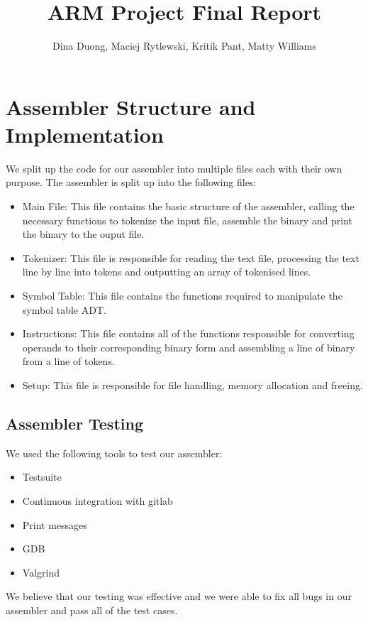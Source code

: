 \documentclass[11pt]{article}
\begin{document}
\title{
    \vspace{-2cm}
    ARM Project Final Report}
\author{Dina Duong, Maciej Rytlewski, Kritik Pant, Matty Williams}

\maketitle

\section{Assembler Structure and Implementation}

We split up the code for our assembler into multiple files each with their own purpose. 
\newline
The assembler is split up into the following files:

\begin{itemize}
    \item Main File: This file contains the basic structure of the assembler, calling the necessary functions to tokenize the input file, assemble the binary and print the binary to the ouput file.
    \item Tokenizer: This file is responsible for reading the text file, processing the text line by line into tokens and outputting an array of tokenised lines.
    \item Symbol Table: This file contains the functions required to manipulate the symbol table ADT.
    \item Instructions: This file contains all of the functions responsible for converting operands to their corresponding binary form and assembling a line of binary from a line of tokens.
    \item Setup: This file is responsible for file handling, memory allocation and freeing. 
\end{itemize}

\subsection{Assembler Testing}
We used the following tools to test our assembler:
\begin{itemize}
    \item Testsuite
    \item Continuous integration with gitlab
    \item Print messages
    \item GDB
    \item Valgrind
\end{itemize}
We believe that our testing was effective and we were able to fix all bugs in our assembler and pass all of the test cases.
\end{document}
